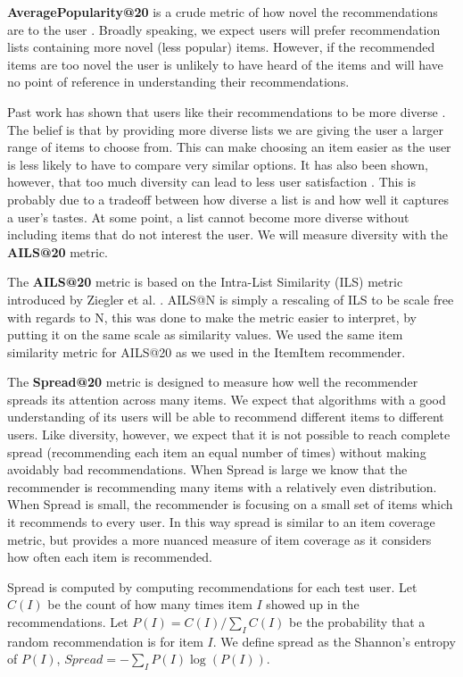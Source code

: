\documentclass[letterpaper]{sig-alternate}
\begin{document}
  {\bf AveragePopularity@20} is a crude metric of how novel the recommendations are to the user \cite{zieglerDiversity}.
  Broadly speaking, we expect users will prefer recommendation lists containing more novel (less popular) items.
  However, if the recommended items are too novel the user is unlikely to have heard of the items and will have no point of reference in understanding their recommendations.

  Past work has shown that users like their recommendations to be more diverse \cite{zieglerDiversity, martijnDiversity}.
  The belief is that by providing more diverse lists we are giving the user a larger range of items to choose from.
  This can make choosing an item easier as the user is less likely to have to compare very similar options.
  It has also been shown, however, that too much diversity can lead to less user satisfaction \cite{zieglerDiversity}.
  This is probably due to a tradeoff between how diverse a list is and how well it captures a user's tastes.
  At some point, a list cannot become more diverse without including items that do not interest the user.
  We will measure diversity with the {\bf AILS@20} metric.

  The {\bf AILS@20} metric is based on the Intra-List Similarity (ILS) metric introduced by Ziegler et al. \cite{zieglerDiversity}.
  AILS@N is simply a rescaling of ILS to be scale free with regards to N, this was done to make the metric easier to interpret, by putting it on the same scale as similarity values.
  We used the same item similarity metric for AILS@20 as we used in the ItemItem recommender.

  The {\bf Spread@20} metric is designed to measure how well the recommender spreads its attention across many items.
  We expect that algorithms with a good understanding of its users will be able to recommend different items to different users.
  Like diversity, however, we expect that it is not possible to reach complete spread (recommending each item an equal number of times) without making avoidably bad recommendations.
  When Spread is large we know that the recommender is recommending many items with a relatively even distribution.
  When Spread is small, the recommender is focusing on a small set of items which it recommends to every user.
  In this way spread is similar to an item coverage metric, but provides a more nuanced measure of item coverage  as it considers how often each item is recommended.

  Spread is computed by computing recommendations for each test user.
  Let $C(I)$ be the count of how many times item $I$ showed up in the recommendations.
  Let $P(I) = C(I) / \sum_I C(I)$ be the probability that a random recommendation is for item $I$.
  We define spread as the Shannon's entropy of $P(I)$, $Spread = -\sum_I P(I) \log(P(I))$.
\end{document}
